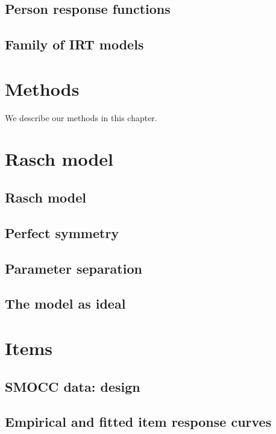\documentclass[]{book}
\begin{document}
\section{Person response functions}\label{person-response-functions}

\section{Family of IRT models}\label{family-of-irt-models}

\chapter{Methods}\label{methods}

We describe our methods in this chapter.

\chapter{Rasch model}\label{rasch}

\section{Rasch model}\label{rasch-model}

\section{Perfect symmetry}\label{perfect-symmetry}

\section{Parameter separation}\label{parameter-separation}

\section{The model as ideal}\label{the-model-as-ideal}

\chapter{Items}\label{items}

\section{SMOCC data: design}\label{smocc-data-design}

\section{Empirical and fitted item response
curves}\label{empirical-and-fitted-item-response-curves}
\end{document}

